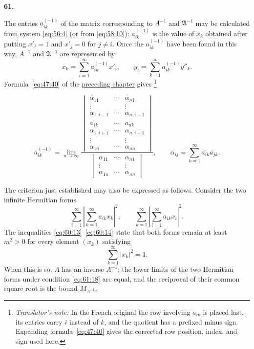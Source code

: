 \documentclass[
  paper=b5,
  fontsize=13pt,
  twoside=true,
  open=any,
  bookmarkpackage=false,
  chapterprefix=true,
  headings=normal
]{scrbook}
\theoremstyle{definition}
\newcommand{\numberedparagraph}[1]{%
  \par\medskip\phantomsection\label{sec:#1}%
  \noindent\textbf{#1.}\enspace
}
\newcounter{translatornote}
\newcommand{\translatornotelabel}{T\arabic{translatornote}}
\newcommand{\translatornote}[1]{%
  \stepcounter{translatornote}%
  \begingroup
    \edef\savedfootnotenumber{\number\value{footnote}}%
    \renewcommand{\thefootnote}{\translatornotelabel}%
    \footnote{\emph{Translator's note:} #1}%
    \setcounter{footnote}{\savedfootnotenumber}%
  \endgroup
}
\begin{document}
\numberedparagraph{61}
The entries $a_{ik}^{(-1)}$ of the matrix corresponding to $A^{-1}$ and
$\mathfrak A^{-1}$ may be calculated from system \eqref{eq:56:4} (or from
\eqref{eq:58:10}): $a_{ik}^{(-1)}$ is the value of $x_k$ obtained after
putting $x'_i=1$ and $x'_j=0$ for $j\neq i$.
Once the $a_{ik}^{(-1)}$ have been found in this way, $A^{-1}$ and
$\mathfrak A^{-1}$ are represented by
\[
  x_k=\sum_{i=1}^{\infty}a_{ik}^{(-1)}x'_i,
  \qquad
  y_i=\sum_{k=1}^{\infty}a_{ik}^{(-1)}y''_k.
\]
Formula~\eqref{eq:47:40} of the \hyperref[chap:3]{preceding chapter} gives
\translatornote{In the French original the row involving \(a_{ik}\) is placed
last, its entries carry \(i\) instead of \(k\), and the quotient has a prefixed
minus sign.  Expanding formula~\eqref{eq:47:40} gives the corrected row position, index,
and sign used here.}
\[
 a_{ik}^{(-1)}=\lim_{n\to\infty}
 \frac{
 \begin{vmatrix}
 \alpha_{11}&\cdots&\alpha_{n1}\\
 \vdots&&\vdots\\
 \alpha_{1,i-1}&\cdots&\alpha_{n,i-1}\\
 \overline{a_{1k}}&\cdots&\overline{a_{nk}}\\
 \alpha_{1,i+1}&\cdots&\alpha_{n,i+1}\\
 \vdots&&\vdots\\
 \alpha_{1n}&\cdots&\alpha_{nn}
 \end{vmatrix}}
 {\begin{vmatrix}
 \alpha_{11}&\cdots&\alpha_{n1}\\
 \vdots&&\vdots\\
 \alpha_{1n}&\cdots&\alpha_{nn}
 \end{vmatrix}},
 \qquad
 \alpha_{ij}=\sum_{k=1}^{\infty}\overline{a_{ik}}a_{jk}.
\]

The criterion just established may also be expressed as follows. Consider
the two infinite Hermitian forms
\begin{equation}
  \sum_{i=1}^{\infty}\left|\sum_{k=1}^{\infty}a_{ik}x_k\right|^2,
  \qquad
  \sum_{k=1}^{\infty}\left|\sum_{i=1}^{\infty}a_{ik}x_i\right|^2.
  \tag{17}\label{eq:61:17}
\end{equation}
The inequalities \eqref{eq:60:13}--\eqref{eq:60:14} state that both forms
remain at least $m^2>0$ for every element $(x_k)$ satisfying
\begin{equation}
  \sum_{k=1}^{\infty}|x_k|^2=1.
  \tag{18}\label{eq:61:18}
\end{equation}
When this is so, $A$ has an inverse $A^{-1}$; the lower limits of the two
Hermitian forms under condition \eqref{eq:61:18} are equal, and the
reciprocal of their common square root is the bound $M_{A^{-1}}$.
\end{document}
